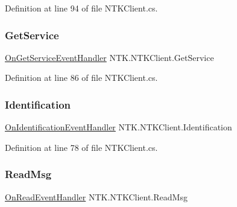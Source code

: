 Definition at line 94 of file N\+T\+K\+Client.\+cs.

\mbox{\label{class_n_t_k_1_1_n_t_k_client_a47d345a839278e8ed85ddb7bad21d3aa}} 
\subsubsection{\texorpdfstring{GetService}{GetService}}
{\footnotesize\ttfamily \mbox{\hyperlink{namespace_n_t_k_af8c7a0dee9d2b4d395e6d806229d2d4f}{On\+Get\+Service\+Event\+Handler}} N\+T\+K.\+N\+T\+K\+Client.\+Get\+Service}







Definition at line 86 of file N\+T\+K\+Client.\+cs.

\mbox{\label{class_n_t_k_1_1_n_t_k_client_ac4c9d101b5c8f191eeb940393618e2a7}} 
\subsubsection{\texorpdfstring{Identification}{Identification}}
{\footnotesize\ttfamily \mbox{\hyperlink{namespace_n_t_k_a7691450f3d18d3bd04ffaf0a7b564b52}{On\+Identification\+Event\+Handler}} N\+T\+K.\+N\+T\+K\+Client.\+Identification}







Definition at line 78 of file N\+T\+K\+Client.\+cs.

\mbox{\label{class_n_t_k_1_1_n_t_k_client_ae5ffca32f666369b608d6bbe3f424639}} 
\subsubsection{\texorpdfstring{ReadMsg}{ReadMsg}}
{\footnotesize\ttfamily \mbox{\hyperlink{namespace_n_t_k_a9fd65121d09e11207741ba8765106f70}{On\+Read\+Event\+Handler}} N\+T\+K.\+N\+T\+K\+Client.\+Read\+Msg}







